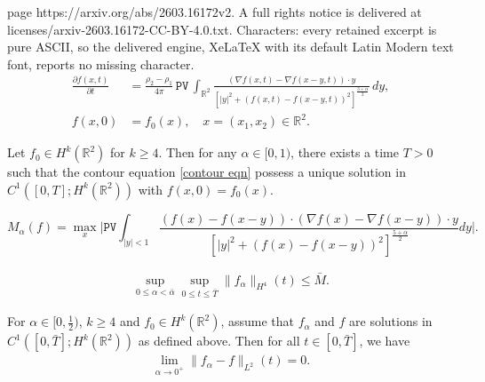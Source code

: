 \documentclass[10pt,a4paper]{amsart}
\newcommand{\PV}{\texttt{PV}}
\newcommand{\R}{\mathbb R}
\begin{document}
page https://arxiv.org/abs/2603.16172v2. A full rights notice is delivered at licenses/arxiv-2603.16172-CC-BY-4.0.txt. Characters: every retained excerpt is pure ASCII, so the delivered engine, XeLaTeX with its default Latin Modern text font, reports no missing character.
\begin{equation}\label{contour eqn}
\begin{split}
\frac{\partial f(x,t)}{\partial t} &= \frac{\rho_2 - \rho_1}{4\pi} \, \PV \, \int_{\mathbb{R}^2} \frac{ \left( \nabla f(x,t) - \nabla f(x - y, t) \right) \cdot y }{ \left[ |y|^2 + (f(x,t) - f(x - y, t))^2 \right]^{\frac{3 + \alpha}{2}}} \, dy, \\
f(x,0) &= f_0(x), \quad x=(x_1, x_2) \in \mathbb{R}^2.
\end{split}
\end{equation}

\begin{thm}\label{local existence thm}
Let $f_0\in H^k(\R^2)$ for $k\ge4$. Then for any $\alpha\in[0,1)$, there exists a time $T>0$ such that the contour equation \eqref{contour eqn} possess a unique solution in $C^1([0,T];H^k(\R^2))$ with $f(x,0)=f_0(x)$.
\end{thm}

\begin{equation}\label{def of M alpha (f)}
M_\alpha(f) = \max_x\Big| \PV \int_{|y|<1}  \frac{\left(f(x)-f(x-y)\right)\cdot \left(\nabla f(x)-\nabla f(x-y)\right)\cdot y}{\left[ |y|^2 + \left(f(x) - f(x - y)\right)^2 \right]^{\frac{5 + \alpha}{2}}}dy\Big|.
\end{equation}

\begin{align}\label{uniform bound on H4 norm}
\sup_{0\le \alpha<\bar{\alpha}}\sup_{0\le t\le \bar{T}}\|f_\alpha\|_{H^4}(t)\le \bar{M}.
\end{align}

\begin{thm}\label{L2 convergence thm}
For $\alpha\in[0,\frac{1}{2})$, $k\ge4$ and $f_0\in H^k(\R^2)$, assume that $f_\alpha$ and $f$ are solutions in $C^1([0,\bar{T}];H^k(\R^2))$ as defined above. Then for all $t\in[0,\bar{T}]$, we have
\begin{align}\label{L2 convergence}
\lim_{\alpha\to0^+}\|f_\alpha - f\|_{L^2}(t)=0.
\end{align}
\end{thm}
\end{document}
